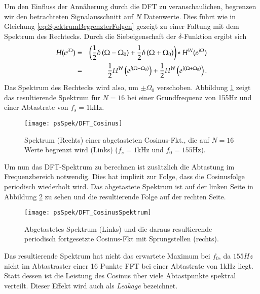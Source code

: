 Um den Einfluss der Annäherung durch die DFT zu veranschaulichen, begrenzen wir den
betrachteten Signalausschnitt auf $N$ Datenwerte. Dies führt wie in Gleichung
\ref{eq:SpektrumBegrenzterFolgen}
gezeigt zu einer Faltung mit dem Spektrum des Rechtecks. Durch die Siebeigenschaft
der $\delta$-Funktion ergibt sich
\begin{eqnarray}
    H (e^{j\Omega}) & = & \left(\frac{1}{2} \delta \left(\Omega - \Omega_0 \right)
       + \frac{1}{2} \delta \left(\Omega + \Omega_0 \right) \right) \ast H^{W} (e^{j\Omega}) \\
           & = & \frac{1}{2} H^{W} \left(e^{j(\Omega -\Omega_0 )}\right) +
                 \frac{1}{2} H^{W} \left(e^{j(\Omega + \Omega_0 )}\right).
\end{eqnarray}
Das Spektrum des Rechtecks wird also, um $\pm \Omega_0$ verschoben.
Abbildung \ref{pic:VerschobesRechteckSpektrum} zeigt
das resultierende Spektrum für $N = 16$ bei einer Grundfrequenz von 155Hz und einer Abtastrate von
$f_s = 1$kHz.

\begin{figure}[H]
\begin{center}
\texttt{[image: psSpek/DFT\_Cosinus]}
\caption{\label{pic:VerschobesRechteckSpektrum}Spektrum (Rechts) einer abgetasteten Cosinus-Fkt., die auf
$N = 16$ Werte begrenzt wird (Links) ($f_s = 1 $kHz und $f_0 = 155$Hz).}
\end{center}
\end{figure}

Um nun das DFT-Spektrum zu berechnen ist zusätzlich die Abtastung im Frequenzbereich notwendig.
Dies hat implizit zur Folge, dass die Cosinusfolge periodisch wiederholt wird. Das
abgetastete Spektrum ist auf der linken Seite in
Abbildung \ref{pic:VerschobesRechteckSpektrumAbgetastet} zu sehen und die resultierende Folge
auf der rechten Seite.

\begin{figure}[H]
\begin{center}
\texttt{[image: psSpek/DFT\_CosinusSpektrum]}
\caption{\label{pic:VerschobesRechteckSpektrumAbgetastet}Abgetastetes Spektrum (Links)
und die daraus resultierende periodisch fortgesetzte Cosinus-Fkt mit Sprungstellen (rechts).}
\end{center}
\end{figure}

Das resultierende Spektrum hat nicht das erwartete Maximum bei $f_0$, da $155Hz$ nicht
im Abtastraster einer 16 Punkte FFT bei einer Abtastrate von 1kHz liegt. Statt dessen ist
die Leistung des Cosinus über viele Abtastpunkte spektral verteilt. Dieser Effekt wird auch als
{\em Leakage} bezeichnet.

